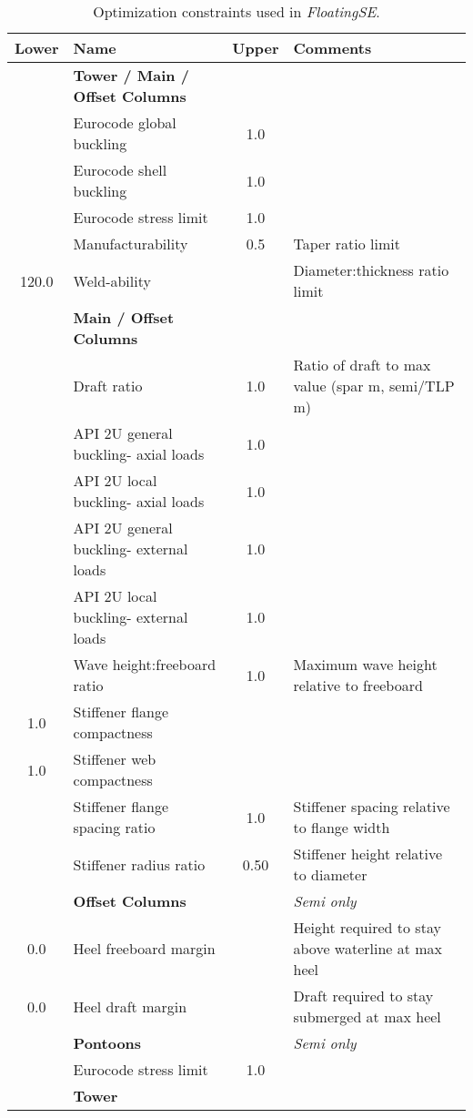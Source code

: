 \begin{table}[htbp] \begin{center}
    \caption{Optimization constraints used in \textit{FloatingSE}.}
    \label{tbl:constraints}
    {\footnotesize
  \begin{tabularx}{\textwidth}{ c l c X} \hline
    \textbf{Lower} & \textbf{Name} & \textbf{Upper} & \textbf{Comments}\\
\hline \hline
 & \textbf{Tower / Main / Offset Columns} &  & \\
 & Eurocode global buckling & 1.0 & \\
 & Eurocode shell buckling & 1.0 & \\
 & Eurocode stress limit & 1.0 & \\
  & Manufacturability & 0.5 & Taper ratio limit\\
  120.0 & Weld-ability &  & Diameter:thickness ratio limit\\
\hline & \textbf{Main / Offset Columns} &  & \\
 & Draft ratio & 1.0 & Ratio of draft to max value (spar \unit[200]{m}, semi/TLP \unit[30]{m})\\
 & API 2U general buckling- axial loads & 1.0 & \\
 & API 2U local buckling- axial loads & 1.0 & \\
 & API 2U general buckling- external loads & 1.0 & \\
 & API 2U local buckling- external loads & 1.0 & \\
 & Wave height:freeboard ratio & 1.0 & Maximum wave height relative to freeboard\\
  1.0 & Stiffener flange compactness &  & \\
  1.0 & Stiffener web compactness &  & \\
 & Stiffener flange spacing ratio & 1.0 & Stiffener spacing relative to flange width\\
 & Stiffener radius ratio & 0.50 & Stiffener height relative to diameter\\
\hline & \textbf{Offset Columns} &  & \textit{Semi only}\\
  0.0 & Heel freeboard margin &  & Height required to stay above waterline at max heel\\
  0.0 & Heel draft margin &  & Draft required to stay submerged at max heel\\
\hline & \textbf{Pontoons} &  & \textit{Semi only}\\
 & Eurocode stress limit & 1.0 &\\
\hline & \textbf{Tower} &  & \\

\end{tabularx}}
\end{center}
\end{table}
